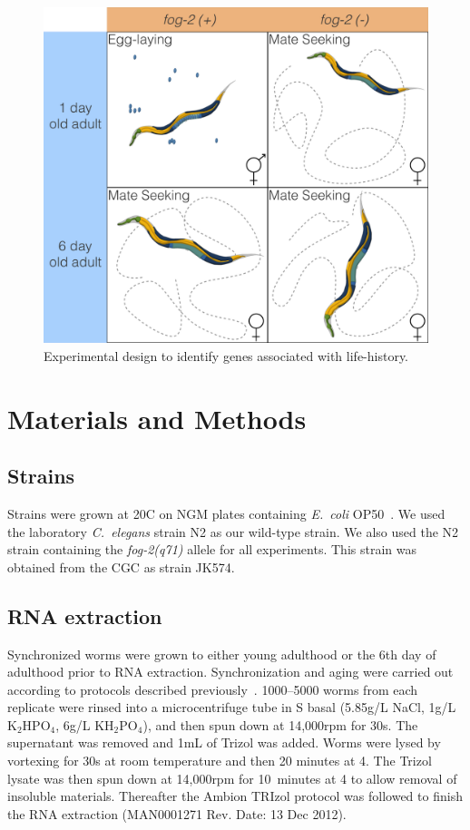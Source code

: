 \documentclass[9pt,twocolumn,twoside]{gsag3jnl}
\newcommand{\cel}{\emph{C.~elegans}}
\newcommand{\fog}{\emph{fog-2}}
\newcommand{\ecol}{\emph{E.~coli}}
\begin{document}
\begin{figure}[htbp]
\renewcommand{\familydefault}{\sfdefault}\normalfont{}
\centering
\includegraphics[width=\linewidth]{../output/figs/final_figs/worm_life_fog2_vs_n2.pdf}
\caption{Experimental design to identify genes associated with life-history.
}%
\label{fig:wormlife}
\end{figure}


\section{Materials and Methods}
\label{sec:materials_methods}

\subsection{Strains}
\label{sub:Strains}
Strains were grown at 20\degree{}C on NGM plates containing \ecol{} OP50~\citep{Brenner1974}. We used the laboratory \cel{} strain N2 as our wild-type strain. We also used the N2 strain containing the \fog{}\emph{(q71)} allele for all experiments. This strain was obtained from the CGC as strain JK574.


\subsection{RNA extraction}
\label{sb:rna_extraction}
Synchronized worms were grown to either young adulthood or the 6th day of adulthood prior to RNA extraction. Synchronization and aging were carried out according to protocols described previously~\citep{Leighton2014}. 1000--5000 worms from each replicate were rinsed into a microcentrifuge tube in S basal (5.85g/L NaCl, 1g/L $\mathrm{K}_2\mathrm{HPO}_4$, 6g/L $\mathrm{KH}_2\mathrm{PO}_4$), and then spun down at 14,000rpm for 30s. The supernatant was removed and 1mL of Trizol was added. Worms were lysed by vortexing for 30s at room temperature and then 20 minutes at 4\degree. The Trizol lysate was then spun down at 14,000rpm for 10~minutes at 4\degree{} to allow removal of insoluble materials. Thereafter the Ambion TRIzol protocol was followed to finish the RNA extraction (MAN0001271 Rev. Date: 13 Dec 2012).
\end{document}
